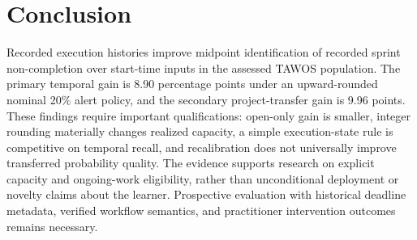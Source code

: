 \section{Conclusion}\label{conclusion}

Recorded execution histories improve midpoint identification of recorded sprint non-completion over start-time inputs in the assessed TAWOS population. The primary temporal gain is 8.90 percentage points under an upward-rounded nominal 20\% alert policy, and the secondary project-transfer gain is 9.96 points. These findings require important qualifications: open-only gain is smaller, integer rounding materially changes realized capacity, a simple execution-state rule is competitive on temporal recall, and recalibration does not universally improve transferred probability quality. The evidence supports research on explicit capacity and ongoing-work eligibility, rather than unconditional deployment or novelty claims about the learner. Prospective evaluation with historical deadline metadata, verified workflow semantics, and practitioner intervention outcomes remains necessary.
